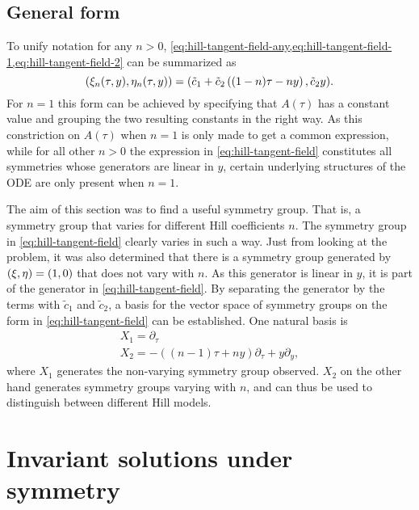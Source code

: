 \subsection{General form}

To unify notation for any \(n>0\), \cref{eq:hill-tangent-field-any,eq:hill-tangent-field-1,eq:hill-tangent-field-2} can be summarized as
\begin{equation} \label{eq:hill-tangent-field}
  \pqty{\xi_n(\tau,y),\eta_n(\tau,y)} = 
  \pqty{\tilde{c}_1 + \tilde{c}_2 \left( (1-n) \tau - n y \right), \tilde{c}_2 y}.
\end{equation}
For \(n=1\) this form can be achieved by specifying that \(A(\tau)\) has a constant value and grouping the two resulting constants in the right way.
As this constriction on \(A(\tau)\) when \(n=1\) is only made to get a common expression, while for all other \(n>0\) the expression in \cref{eq:hill-tangent-field} constitutes all symmetries whose generators are linear in \(y\), certain underlying structures of the ODE are only present when \(n=1\). %

The aim of this section was to find a useful symmetry group.
That is, a symmetry group that varies for different Hill coefficients \(n\).
The symmetry group in \cref{eq:hill-tangent-field} clearly varies in such a way.
Just from looking at the problem, it was also determined that there is a symmetry group generated by \(\pqty{\xi,\eta} = \pqty{1,0}\) that does not vary with \(n\).
As this generator is linear in \(y\), it is part of the generator in \cref{eq:hill-tangent-field}.
By separating the generator by the terms with \(\tilde{c}_1\) and \(\tilde{c}_2\), a basis for the vector space of symmetry groups on the form in \cref{eq:hill-tangent-field} can be established.
One natural basis is
\begin{gather}
  X_1 = \partial_\tau \\
  X_2 = - \left( (n-1) \tau + n y \right) \partial_\tau + y \partial_y,
\end{gather}
where \(X_1\) generates the non-varying symmetry group observed.
\(X_2\) on the other hand generates symmetry groups varying with \(n\), and can thus be used to distinguish between different Hill models.


\section{Invariant solutions under symmetry}

